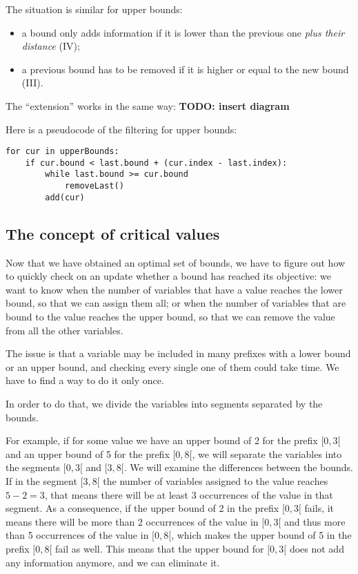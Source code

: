 \documentclass[a4paper,10pt]{article}
\begin{document}
The situation is similar for upper bounds:
\begin{itemize}
    \item a bound only adds information if it is lower than the previous one \emph{plus their distance} (IV);
    \item a previous bound has to be removed if it is higher or equal to the new bound (III).
\end{itemize}

The ``extension'' works in the same way: \textbf{TODO: insert diagram}

Here is a pseudocode of the filtering for upper bounds:
\begin{lstlisting}
for cur in upperBounds:
    if cur.bound < last.bound + (cur.index - last.index):
        while last.bound >= cur.bound
            removeLast()
        add(cur)
\end{lstlisting}

\subsection{The concept of critical values}
\label{subsec:critical}

Now that we have obtained an optimal set of bounds, we have to figure out how to quickly check on an update whether a bound has reached its objective: we want to know when the number of variables that have a value reaches the lower bound, so that we can assign them all; or when the number of variables that are bound to the value reaches the upper bound, so that we can remove the value from all the other variables.

The issue is that a variable may be included in many prefixes with a lower bound or an upper bound, and checking every single one of them could take time. We have to find a way to do it only once.

In order to do that, we divide the variables into segments separated by the bounds.

For example, if for some value we have an upper bound of 2 for the prefix $[0,3[$ and an upper bound of 5 for the prefix $[0,8[$, we will separate the variables into the segments $[0,3[$ and $[3,8[$. We will examine the differences between the bounds. If in the segment $[3,8[$ the number of variables assigned to the value reaches $5-2=3$, that means there will be at least 3 occurrences of the value in that segment. As a consequence, if the upper bound of 2 in the prefix $[0,3[$ fails, it means there will be more than 2 occurrences of the value in $[0,3[$ and thus more than 5 occurrences of the value in $[0,8[$, which makes the upper bound of 5 in the prefix $[0,8[$ fail as well. This means that the upper bound for $[0,3[$ does not add any information anymore, and we can eliminate it.
\end{document}
